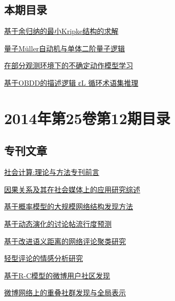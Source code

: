 \documentclass[a4paper]{article}
\begin{document}
\subsection{本期目录}
\href{http://www.jos.org.cn/ch/reader/download_pdf.aspx?file_no=4408&year_id=2014&quarter_id=1&falg=1}{基于余归纳的最小Kripke结构的求解}

\href{http://www.jos.org.cn/ch/reader/download_pdf.aspx?file_no=4406&year_id=2014&quarter_id=1&falg=1}{量子Müller自动机与单体二阶量子逻辑}

\href{http://www.jos.org.cn/ch/reader/download_pdf.aspx?file_no=4417&year_id=2014&quarter_id=1&falg=1}{在部分观测环境下的不确定动作模型学习}

\href{http://www.jos.org.cn/ch/reader/download_pdf.aspx?file_no=4403&year_id=2014&quarter_id=1&falg=1}{基于OBDD的描述逻辑 εL 循环术语集推理}


\section{\textbf{2014年第25卷第12期目录}}
\subsection{专刊文章}
\href{http://www.jos.org.cn/ch/reader/download_pdf.aspx?file_no=4732&year_id=2014&quarter_id=12&falg=1}{社会计算:理论与方法专刊前言}

\href{http://www.jos.org.cn/ch/reader/download_pdf.aspx?file_no=4724&year_id=2014&quarter_id=12&falg=1}{因果关系及其在社会媒体上的应用研究综述}

\href{http://www.jos.org.cn/ch/reader/download_pdf.aspx?file_no=4722&year_id=2014&quarter_id=12&falg=1}{基于概率模型的大规模网络结构发现方法}

\href{http://www.jos.org.cn/ch/reader/download_pdf.aspx?file_no=4730&year_id=2014&quarter_id=12&falg=1}{基于动态演化的讨论帖流行度预测}

\href{http://www.jos.org.cn/ch/reader/download_pdf.aspx?file_no=4729&year_id=2014&quarter_id=12&falg=1}{基于改进语义距离的网络评论聚类研究}

\href{http://www.jos.org.cn/ch/reader/download_pdf.aspx?file_no=4728&year_id=2014&quarter_id=12&falg=1}{轻型评论的情感分析研究}

\href{http://www.jos.org.cn/ch/reader/download_pdf.aspx?file_no=4720&year_id=2014&quarter_id=12&falg=1}{基于R-C模型的微博用户社区发现}

\href{http://www.jos.org.cn/ch/reader/download_pdf.aspx?file_no=4721&year_id=2014&quarter_id=12&falg=1}{微博网络上的重叠社群发现与全局表示}
\end{document}

